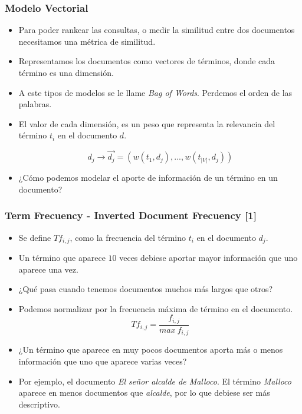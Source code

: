 \documentclass[handout]{beamer}
\begin{document}
\begin{frame}\frametitle{Modelo Vectorial}
\footnotesize{
\begin{itemize}
 \item Para poder rankear las consultas, o medir la similitud entre dos documentos necesitamos una métrica de similitud.
 \item Representamos los documentos como vectores de términos, donde cada término es una dimensión.
 \item A este tipos de modelos se le llame \emph{Bag of Words}. Perdemos el orden de las palabras. 
 \item El valor de cada dimensión, es un peso que representa la relevancia del término $t_{i}$ en el documento $d$.

\begin{equation}
 d_{j} \rightarrow \overrightarrow{d_{j}}=(w(t_{1},d_{j}),...,w(t_{|V|},d_{j}))
\end{equation}

\item ¿Cómo podemos modelar el aporte de información de un término en un documento?
 
\end{itemize}

}
 
\end{frame}

\begin{frame}\frametitle{Term Frecuency - Inverted Document Frecuency [1]}
\footnotesize{
\begin{itemize}
 \item Se define $Tf_{i,j}$, como la frecuencia del término $t_{i}$ en el documento $d_{j}$.
 \item Un término que aparece $10$ veces debiese aportar mayor información que uno aparece una vez.
 \item ¿Qué pasa cuando tenemos documentos muchos más largos que otros?
 \item Podemos normalizar por la frecuencia máxima de término en el documento. 
\begin{displaymath}
 Tf_{i,j}=\frac{f_{i,j}}{max \ f_{i,j}}
\end{displaymath}
\item ¿Un término que aparece en muy pocos documentos aporta más o menos información que uno que aparece varias veces?
\item Por ejemplo, el documento \emph{El señor alcalde de Malloco}. El término \emph{Malloco} aparece en menos documentos que \emph{alcalde}, por lo que debiese ser más descriptivo. 
\end{itemize}


} 
\end{frame}
\end{document}

